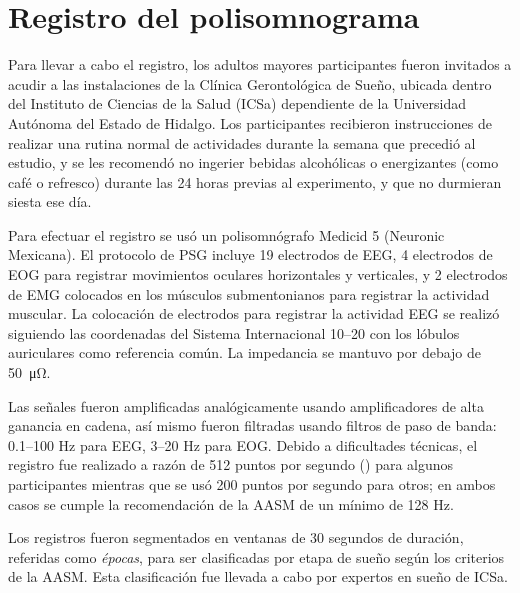
\section{Registro del polisomnograma}

Para llevar a cabo el registro, los adultos mayores participantes fueron invitados a acudir a las 
instalaciones de la Clínica Gerontológica de Sueño, ubicada dentro del Instituto de Ciencias de la 
Salud (ICSa) dependiente de la Universidad Autónoma del Estado de Hidalgo. Los participantes 
recibieron instrucciones de realizar una rutina normal de actividades durante la semana que 
precedió al estudio, y se les recomendó no ingerier bebidas alcohólicas o energizantes (como café 
o refresco) durante las 24 horas previas al experimento, y que no durmieran siesta ese día.

Para efectuar el registro se usó un polisomnógrafo Medicid 5 (Neuronic Mexicana).
El protocolo de PSG incluye 19 electrodos de EEG, 4 electrodos de EOG para registrar movimientos 
oculares horizontales y verticales, y 2 electrodos de EMG colocados en los músculos submentonianos 
para registrar la actividad muscular. 
La colocación de electrodos para registrar la actividad EEG se realizó siguiendo las coordenadas 
del Sistema Internacional 10--20 con los lóbulos auriculares como referencia común.
%
La impedancia se mantuvo por debajo de \SI{50}{\micro\ohm}.

Las señales fueron amplificadas analógicamente usando amplificadores de alta ganancia en cadena, 
así mismo fueron filtradas usando filtros de paso de banda: 0.1--100 Hz para EEG, 3--20 Hz para EOG. 
Debido a dificultades técnicas, el registro fue realizado a razón de 512 puntos por segundo (\hz) 
para algunos participantes mientras que se usó 200 puntos por segundo para otros; en ambos casos
se cumple la recomendación de la AASM de un mínimo de 128 Hz.

Los registros fueron segmentados en ventanas de 30 segundos de duración, referidas como 
\textit{épocas}, para ser clasificadas por etapa de sueño según los criterios de la AASM. Esta
clasificación fue llevada a cabo por expertos en sueño de ICSa.


